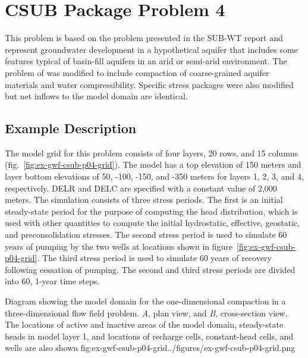 \section{CSUB Package Problem 4}

This problem is based on the problem presented in the SUB-WT report \citep{leake2007modflow} and represent groundwater development in a hypothetical aquifer that includes some features typical of basin-fill aquifers in an arid or semi-arid environment. The problem of \cite{leake2007modflow} was modified to include compaction of coarse-grained aquifer materials and water compressibility. Specific stress packages were also modified but net inflows to the model domain are identical.

\subsection{Example Description}

The model grid for this problem consists of four layers, 20 rows, and 15 columns (fig.~\ref{fig:ex-gwf-csub-p04-grid}).  The model has a top elevation of 150 meters and layer bottom elevations of 50, -100, -150, and -350 meters for layers 1, 2, 3, and 4, respectively.  DELR and DELC are specified with a constant value of 2,000 meters. The simulation consists of three stress periods. The first is an initial steady-state period for the purpose of computing the head distribution, which is used with other quantities to compute the initial hydrostatic, effective, geostatic, and preconsolidation stresses. The second stress period is used to simulate 60 years of pumping by the two wells at locations shown in figure~\ref{fig:ex-gwf-csub-p04-grid}. The third stress period is used to simulate 60 years of recovery following cessation of pumping. The second and third stress periods are divided into 60, 1-year time steps.

\begin{StandardFigure}{
                                     Diagram showing the model domain for the one-dimensional compaction in a 
                                     three-dimensional flow field problem. \textit{A}, plan view, and \textit{B}, cross-section 
                                     view. The locations of active and inactive areas of the model domain, steady-state 
                                     heads in model layer 1, and locations of recharge cells, constant-head cells, 
                                     and wells are also shown
                                     }{fig:ex-gwf-csub-p04-grid}{../figures/ex-gwf-csub-p04-grid.png}
\end{StandardFigure}                                 

